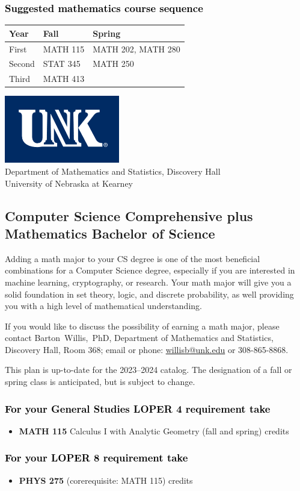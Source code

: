 \documentclass[11pt]{article}
\makeatletter
\newcommand{\calcone}{\textbf{MATH 115} Calculus I with Analytic Geometry (fall and spring) \dotfill 5 credits}
\newcommand{\calconeshort}{MATH 115}
\newcommand{\calctwoshort}{MATH 202}
\newcommand{\foundationsshort}{MATH 250}
\newcommand{\linearshort}{MATH 280}
\newcommand{\discreteshort}{MATH 413}
\newcommand{\appliedstatshort}{STAT 345}
\newcommand{\physics}{\textbf{PHYS 275}  (corerequisite: \calconeshort) \dotfill 3 credits}
\newcommand{\contactbw}{\mbox{Barton Willis, PhD}, Department of Mathematics and Statistics,  Discovery Hall, Room 368;
email or phone: \href{mailto:willisb@unk.edu}{willisb@unk.edu} or 308-865-8868.}
\newcommand{\forinfo}[2]{If you would like to discuss the possibility of earning a math {#1}, please contact \contactbw}
\newcommand{\catalog}{2023--2024 }
\newcommand{\LOPER}{LOPER\xspace}
\newcommand{\uptodate}{This plan is up-to-date for  the \catalog catalog. The designation of a fall or spring class is 
anticipated, but  is subject to change.}
\newcommand{\myheading}{
\begin{flushleft}
\includegraphics[scale=0.35]{unk-logo}\\
\setcounter{footnote}{0}
\vspace{0.25in}
 \textcolor{unkblue}{Department of Mathematics and Statistics, Discovery Hall} \\
  \textcolor{unkblue}{University of Nebraska at Kearney}
\end{flushleft}}
\newcommand{\mathminor}{
  \begin{center}
   \begin{tabular}[h]{| l | l | l|} 
      \hline
      \textbf{Year} & \textbf{Fall}         &  \textbf{Spring}  \\ \hline 
      First & \calconeshort & \calctwoshort, \linearshort \\  \hline
      Second &  \appliedstatshort{} &  \foundationsshort \\ \hline
      Third &    \discreteshort              &  \\ \hline
      \end{tabular}
      \end{center}}
\makeatother
\begin{document}
\vspace{-0.1in}
\subsubsection*{\textcolor{black}{Suggested mathematics course sequence}}

\begin{center}
\mathminor
\end{center}


 


\newpage

\myheading



\vspace{-0.1in}
\subsection*{\textbf{\textcolor{unkblue}{Computer Science Comprehensive plus Mathematics Bachelor of Science}}}

Adding a math major to your CS degree is one of the most beneficial combinations for 
a Computer Science degree, especially if you are interested in machine learning, 
cryptography,   or research.  Your math major  will give you a solid foundation 
in set theory, logic, and discrete probability, 
as well providing you with a high level of mathematical understanding. 



\forinfo{major}{Computer Science Comprehensive degree}

\uptodate

\subsubsection*{\textcolor{black}{For your General Studies \LOPER 4 requirement take}}
\begin{itemize}
\item \calcone
\end{itemize}

\subsubsection*{\textcolor{black}{For your \LOPER 8 requirement take}}

\begin{itemize}
   \item \physics 
\end{itemize}
\end{document}
